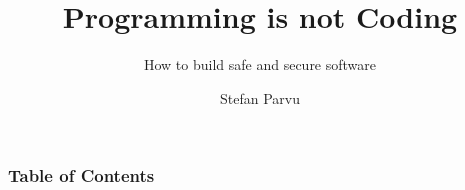 \documentclass[aspectratio=1610]{beamer}
\title{\huge{Programming is not Coding}}
\subtitle{How to build safe and secure software}
\author{Stefan Parvu}
\begin{document}
\begin{frame}
\end{frame}


\begin{frame}
	\maketitle %
\end{frame}



\begin{frame}
\frametitle{Table of Contents}
\tableofcontents

%     
% 
% 
\end{frame}
\end{document}
